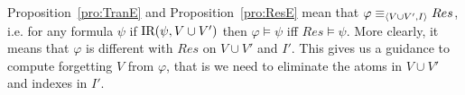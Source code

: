 \documentclass[letterpaper]{article} %
\begin{document}

Proposition~\ref{pro:TranE} and Proposition~\ref{pro:ResE} mean that $\varphi \equiv_{{\langle{V \cup V', I}\rangle}} Res$, i.e. for any formula $\psi$ if $\textrm{IR}(\psi, V\cup V')$ then $\varphi \models \psi$ iff $Res \models \psi$.
More clearly, it means that $\varphi$ is different with $Res$ on $V \cup V'$ and $I'$. This gives us a guidance to compute forgetting $V$ from $\varphi$, that is we need to eliminate the atoms in $V \cup V'$ and indexes in $I'$. 



\end{document}
